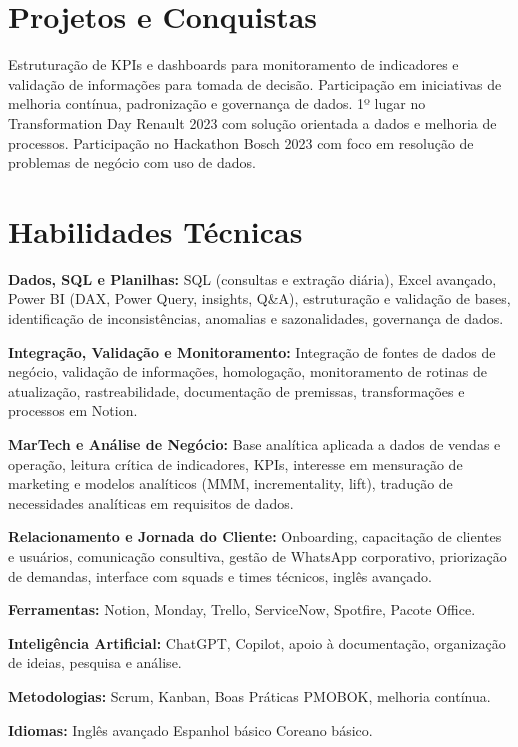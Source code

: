 \documentclass[11pt,a4paper]{article}
\begin{document}
\section*{Projetos e Conquistas}

Estruturação de KPIs e dashboards para monitoramento de indicadores e validação de informações para tomada de decisão. Participação em iniciativas de melhoria contínua, padronização e governança de dados. 1º lugar no Transformation Day Renault 2023 com solução orientada a dados e melhoria de processos. Participação no Hackathon Bosch 2023 com foco em resolução de problemas de negócio com uso de dados.

\section*{Habilidades Técnicas}

\textbf{Dados, SQL e Planilhas:} SQL (consultas e extração diária), Excel avançado, Power BI (DAX, Power Query, insights, Q\&A), estruturação e validação de bases, identificação de inconsistências, anomalias e sazonalidades, governança de dados.

\textbf{Integração, Validação e Monitoramento:} Integração de fontes de dados de negócio, validação de informações, homologação, monitoramento de rotinas de atualização, rastreabilidade, documentação de premissas, transformações e processos em Notion.

\textbf{MarTech e Análise de Negócio:} Base analítica aplicada a dados de vendas e operação, leitura crítica de indicadores, KPIs, interesse em mensuração de marketing e modelos analíticos (MMM, incrementality, lift), tradução de necessidades analíticas em requisitos de dados.

\textbf{Relacionamento e Jornada do Cliente:} Onboarding, capacitação de clientes e usuários, comunicação consultiva, gestão de WhatsApp corporativo, priorização de demandas, interface com squads e times técnicos, inglês avançado.

\textbf{Ferramentas:} Notion, Monday, Trello, ServiceNow, Spotfire, Pacote Office.

\textbf{Inteligência Artificial:} ChatGPT, Copilot, apoio à documentação, organização de ideias, pesquisa e análise.

\textbf{Metodologias:} Scrum, Kanban, Boas Práticas PMOBOK, melhoria contínua.

\textbf{Idiomas:} Inglês avançado \textbullet{} Espanhol básico \textbullet{} Coreano básico.
\end{document}
